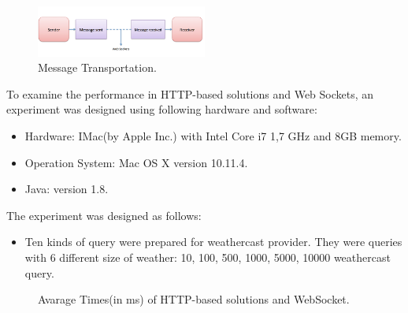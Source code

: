 \begin{figure}[!htb]
  \centering
  \includegraphics[width=0.5\textwidth]{Figures/websocket.png}
  \caption[Message Transportation.]{Message Transportation.}
  \label{fig:websocket}
\end{figure}

To examine the performance in HTTP-based solutions and Web Sockets, an experiment was designed using following hardware and software:

\begin{itemize}
\item 	Hardware: IMac(by Apple Inc.) with Intel Core i7 1,7 GHz and 8GB memory.
\item 	Operation System: Mac OS X version 10.11.4.
\item 	Java: version 1.8.
\end{itemize}

The experiment was designed as follows:
\begin{itemize}
\item Ten kinds of query were prepared for weathercast provider. They were queries with 6 different size of weather: 10, 100, 500, 1000, 5000, 10000 weathercast query.
\end{itemize}

\begin{figure}
\caption{Avarage Times(in ms) of HTTP-based solutions and WebSocket.}
\label{fig:executiontimewebsocket}
\end{figure}

